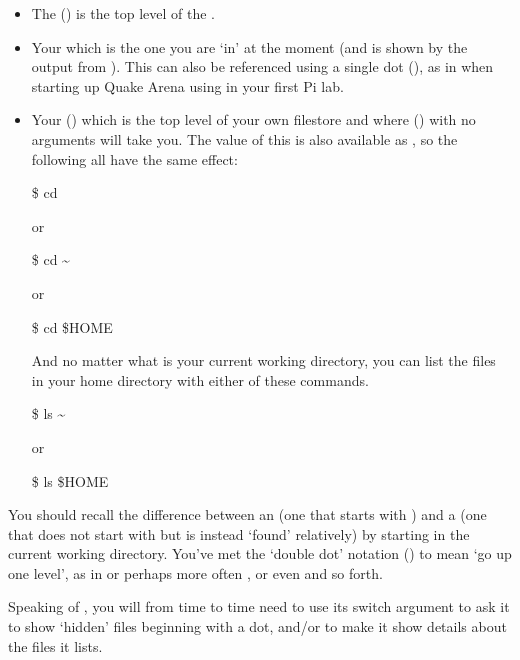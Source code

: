 \begin{itemize}
\item The  (\ttout{/}) is the top level of the
.

\item Your  which is the one you are `in'
at the moment (and is shown by the output from ). This can also
be referenced using a single dot (), as in when starting up Quake Arena using 
 in your first Pi lab. 

\item Your  (\ttout{\tilde}) which is the top level of
your own filestore and where  () with no
arguments will take you.  The value of this is also available as
, so the following all have the same effect:

\begin{ttoutenv}
\$  cd
\end{ttoutenv}
or
\begin{ttoutenv}
\$  cd \textasciitilde 
\end{ttoutenv}
or
\begin{ttoutenv}
\$  cd \$HOME
\end{ttoutenv}

And no matter what is your current working directory, you can list the files
in your home directory with either of these commands.

\begin{ttoutenv}
\$  ls \textasciitilde
\end{ttoutenv}
or
\begin{ttoutenv}
\$  ls \$HOME 
\end{ttoutenv}

\end{itemize}

You should recall the difference between an  (one
that starts with \ttout{/}) and a  (one that does not
start with \ttout{/} but is instead `found' relatively) by starting in the
current working directory. You've met the `double dot' notation
() to mean `go up one level', as in  or perhaps more
often , or even  and so forth.

Speaking of , you will from time to time need to use its
 switch argument to ask it to show `hidden' files beginning with a dot,
and/or  to make it show details about the files it lists.

